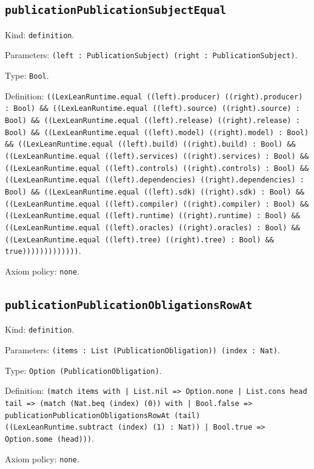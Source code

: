 \documentclass[11pt]{article}
\begin{document}
\subsection*{\texttt{publicationPublicationSubjectEqual}}
\noindent Kind: \texttt{definition}.\par
\noindent Parameters: \texttt{(left : PublicationSubject) (right : PublicationSubject)}.\par
\noindent Type: \texttt{Bool}.\par
\noindent Definition: \texttt{((LexLeanRuntime.equal ((left).producer) ((right).producer) : Bool) \&\& ((LexLeanRuntime.equal ((left).source) ((right).source) : Bool) \&\& ((LexLeanRuntime.equal ((left).release) ((right).release) : Bool) \&\& ((LexLeanRuntime.equal ((left).model) ((right).model) : Bool) \&\& ((LexLeanRuntime.equal ((left).build) ((right).build) : Bool) \&\& ((LexLeanRuntime.equal ((left).services) ((right).services) : Bool) \&\& ((LexLeanRuntime.equal ((left).controls) ((right).controls) : Bool) \&\& ((LexLeanRuntime.equal ((left).dependencies) ((right).dependencies) : Bool) \&\& ((LexLeanRuntime.equal ((left).sdk) ((right).sdk) : Bool) \&\& ((LexLeanRuntime.equal ((left).compiler) ((right).compiler) : Bool) \&\& ((LexLeanRuntime.equal ((left).runtime) ((right).runtime) : Bool) \&\& ((LexLeanRuntime.equal ((left).oracles) ((right).oracles) : Bool) \&\& ((LexLeanRuntime.equal ((left).tree) ((right).tree) : Bool) \&\& true)))))))))))))}.\par
\noindent Axiom policy: \texttt{none}.\par
\subsection*{\texttt{publicationPublicationObligationsRowAt}}
\noindent Kind: \texttt{definition}.\par
\noindent Parameters: \texttt{(items : List (PublicationObligation)) (index : Nat)}.\par
\noindent Type: \texttt{Option (PublicationObligation)}.\par
\noindent Definition: \texttt{(match items with | List.nil => Option.none | List.cons head tail => (match (Nat.beq (index) (0)) with | Bool.false => publicationPublicationObligationsRowAt (tail) ((LexLeanRuntime.subtract (index) (1) : Nat)) | Bool.true => Option.some (head)))}.\par
\noindent Axiom policy: \texttt{none}.\par
\end{document}
